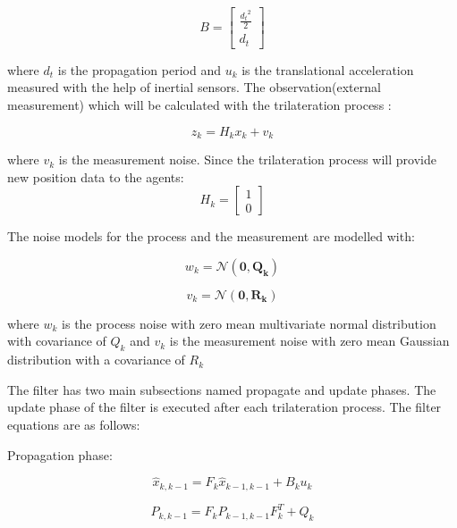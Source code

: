 \begin{equation}
B = \begin{bmatrix}
\frac{{d_t}^2}{2} \\
d_t
\end{bmatrix}
\end{equation}

where $d_t$ is the propagation period and $u_k$ is the translational acceleration measured with the help of inertial sensors. The observation(external measurement) which will be calculated with the trilateration process :

\begin{equation}
z_k = H_kx_k + v_k
\end{equation}

where $v_k$ is the measurement noise. Since the trilateration process will provide new position data to the agents:
\begin{equation}
H_k = \begin{bmatrix}
1\\0
\end{bmatrix}
\end{equation}
	
The noise models for the process and the measurement are modelled with:

\begin{equation}
 w_k = \mathcal{N}(\mathbf{0,Q_k})
\end{equation}
	
\begin{equation}
v_k = \mathcal{N}(\mathbf{0,R_k})
\end{equation}
		
where $w_k$ is the process noise with zero mean multivariate normal distribution with covariance of $Q_k$ and $v_k$ is the measurement noise with zero mean Gaussian distribution with a covariance of $R_k$
		
The filter has two main subsections named propagate and update phases. The update phase of the filter is executed after each trilateration process. The filter equations are as follows:
		
Propagation phase:

\begin{equation}
\hat{x}_{k,k-1} = F_k\hat{x}_{k-1,k-1} + B_ku_k
\end{equation}
		
\begin{equation}
 P_{k,k-1} = F_k P_{k-1,k-1}F^T_k + Q_k
\end{equation}
		
